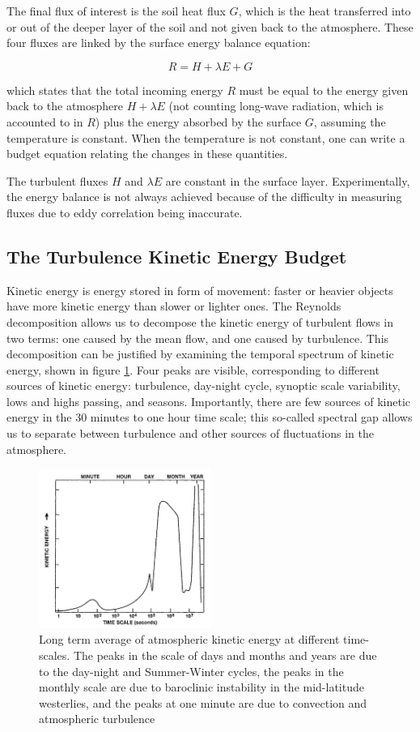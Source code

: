 \documentclass[a4paper]{book}
\begin{document}
The final flux of interest is the soil heat flux $G$, which is the heat transferred into or out of the deeper layer of the soil and not given back to the atmosphere. These four fluxes are linked by the surface energy balance equation:

$$
R=H+\lambda E+G
$$

which states that the total incoming energy $R$ must be equal to the energy given back to the atmosphere $H+\lambda E$ (not counting long-wave radiation, which is accounted to in $R$) plus the energy absorbed by the surface $G$, assuming the temperature is constant. When the temperature is not constant, one can write a budget equation relating the changes in these quantities.

The turbulent fluxes $H$ and $\lambda E$ are constant in the surface layer. Experimentally, the energy balance is not always achieved \citep{cabauwinsitu} because of the difficulty in measuring fluxes due to eddy correlation being inaccurate.

\subsection{The Turbulence Kinetic Energy Budget}
Kinetic energy is energy stored in form of movement: faster or heavier objects have more kinetic energy than slower or lighter ones. The Reynolds decomposition allows us to decompose the kinetic energy of turbulent flows in two terms: one caused by the mean flow, and one caused by turbulence. This decomposition can be justified by examining the temporal spectrum of kinetic energy, shown in figure \ref{fig:tkespectrum}. Four peaks are visible, corresponding to different sources of kinetic energy: turbulence, day-night cycle, synoptic scale variability, lows and highs passing, and seasons. Importantly, there are few sources of kinetic energy in the 30 minutes to one hour time scale; this so-called spectral gap allows us to separate between turbulence and other sources of fluctuations in the atmosphere.

\begin{figure}
\caption{Long term average of atmospheric kinetic energy at different time-scales. The peaks in the scale of days and months and years are due to the day-night and Summer-Winter cycles, the peaks in the monthly scale are due to baroclinic instability in the mid-latitude westerlies, and the peaks at one minute are due to convection and atmospheric turbulence \citep{tkespectrumsrc,tkespectrumorig}}
\label{fig:tkespectrum}
\centering
\includegraphics[width=0.5\textwidth]{images/kinetic_energy_spectrum}
\end{figure}
\end{document}
